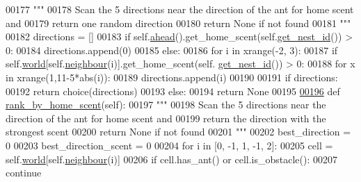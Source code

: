 \begin{DoxyCode}
00177         \textcolor{stringliteral}{"""}
00178 \textcolor{stringliteral}{        Scan the 5 directions near the direction of the ant for home scent and}
00179 \textcolor{stringliteral}{        return one random direction}
00180 \textcolor{stringliteral}{        return None if not found}
00181 \textcolor{stringliteral}{        """}
00182         directions = []
00183         \textcolor{keywordflow}{if} self.\hyperlink{classants_1_1Ant_ac2c8f048d99cd48a5829ddf7ff4a708a}{ahead}().get\_home\_scent(self.\hyperlink{classants_1_1Ant_a10dc42722864d5850912dd34242d5cf8}{get\_nest\_id}()) > 0:
00184             directions.append(0)
00185         \textcolor{keywordflow}{else}:
00186             \textcolor{keywordflow}{for} i \textcolor{keywordflow}{in} xrange(-2, 3):
00187                 \textcolor{keywordflow}{if} self.\hyperlink{classants_1_1Ant_a55f64c7cafb3806bdcfda42586adbff5}{world}[self.\hyperlink{classants_1_1Ant_a2ddd97dadaa5d24c459b0117dc6e1190}{neighbour}(i)].get\_home\_scent(self.
      \hyperlink{classants_1_1Ant_a10dc42722864d5850912dd34242d5cf8}{get\_nest\_id}()) > 0:
00188                     \textcolor{keywordflow}{for} x \textcolor{keywordflow}{in} xrange(1,11-5*abs(i)):
00189                         directions.append(i) 
00190 
00191         \textcolor{keywordflow}{if} directions:
00192             \textcolor{keywordflow}{return} choice(directions)
00193         \textcolor{keywordflow}{else}:
00194             \textcolor{keywordflow}{return} \textcolor{keywordtype}{None}
00195 
\hypertarget{ants_8py_source_l00196}{}\hyperlink{classants_1_1Ant_a6f3e3bd98a5f382098cdc1c02e1e2fd0}{00196}     \textcolor{keyword}{def }\hyperlink{classants_1_1Ant_a6f3e3bd98a5f382098cdc1c02e1e2fd0}{rank\_by\_home\_scent}(self):
00197         \textcolor{stringliteral}{"""}
00198 \textcolor{stringliteral}{        Scan the 5 directions near the direction of the ant for home scent and}
00199 \textcolor{stringliteral}{        return the direction with the strongest scent}
00200 \textcolor{stringliteral}{        return None if not found}
00201 \textcolor{stringliteral}{        """}
00202         best\_direction = 0
00203         best\_direction\_scent = 0
00204         \textcolor{keywordflow}{for} i \textcolor{keywordflow}{in} [0, -1, 1, -1, 2]:
00205             cell = self.\hyperlink{classants_1_1Ant_a55f64c7cafb3806bdcfda42586adbff5}{world}[self.\hyperlink{classants_1_1Ant_a2ddd97dadaa5d24c459b0117dc6e1190}{neighbour}(i)]
00206             \textcolor{keywordflow}{if} cell.has\_ant() \textcolor{keywordflow}{or} cell.is\_obstacle():
00207                 \textcolor{keywordflow}{continue}

\end{DoxyCode}
